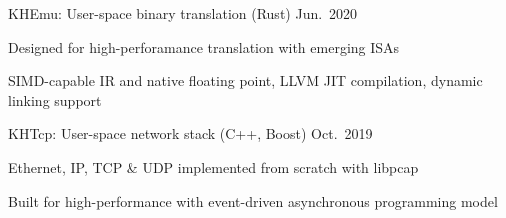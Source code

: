 

\begin{cventries}

  \cventry
    {KHEmu: User-space binary translation (Rust)}
    {}{}
    {Jun.\ 2020} %
    {
      \begin{cvitems} %
        \item {Designed for high-perforamance translation with emerging ISAs}
        \item {SIMD-capable IR and native floating point, LLVM JIT compilation, dynamic linking support}
      \end{cvitems}
    }

    \begin{comment}
  \cventry
    {RISC-V experiment platform on Zynq UltraScale+ MPSoC} %
    {}{}
    {Jan.\ 2020} %
    {
      \begin{cvitems} %
        \item {Based on Rocket Chip from UCB implemented on FPGA, tailored for computer architecture research}
        \item {High-speed debugging based on coherent memories and GPIO JTAG}
      \end{cvitems}
    }
    \end{comment}

  \cventry
    {KHTcp: User-space network stack (C++, Boost)} %
    {}{}
    {Oct.\ 2019} %
    {
        \begin{cvitems} %
        \item {Ethernet, IP, TCP \& UDP implemented from scratch with libpcap}
        \item {Built for high-performance with event-driven asynchronous programming model}
        \end{cvitems}
    }

\end{cventries}
